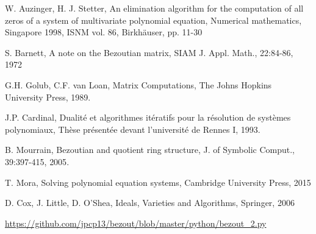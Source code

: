 \documentclass{standalone}
\begin{document}
  \begin{thebibliography}{00}

  {W. Auzinger, H. J. Stetter},
  {An elimination algorithm for the computation of all zeros of a system of multivariate polynomial equation},
  {Numerical mathematics, Singapore 1998, ISNM vol. 86, Birkhäuser, pp. 11-30}

  {S. Barnett}, {A note on the Bezoutian matrix},
  {SIAM J. Appl. Math., 22:84-86}, {1972}

  {G.H. Golub, C.F. van Loan},
  {Matrix Computations}, {The Johns Hopkins University Press}, {1989}.

  {J.P. Cardinal}, {Dualité et algorithmes itératifs pour la résolution de systèmes polynomiaux}, {Thèse présentée devant l'université de Rennes I}, {1993}.

  {B. Mourrain}, {Bezoutian and quotient ring structure},
  {J. of Symbolic Comput., 39:397-415}, {2005}.

  {T. Mora}, {Solving polynomial equation systems}, {Cambridge University Press}, {2015}

  {D. Cox, J. Little, D. O'Shea},
  {Ideals, Varieties and Algorithms}, {Springer}, {2006}

  \url{https://github.com/jpcp13/bezout/blob/master/python/bezout_2.py}

  \end{thebibliography}
\end{document}
